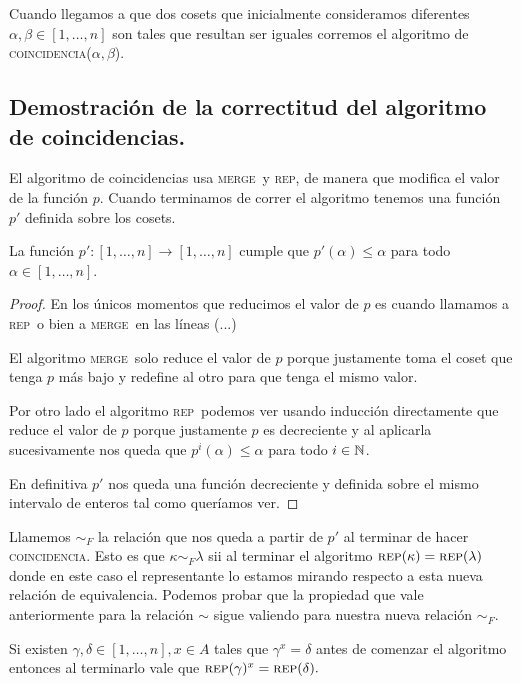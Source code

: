 \documentclass[tesis.tex]{subfiles}
\newcommand{\rep}{\textsc{rep}}
\newcommand{\coin}{\textsc{coincidencia}}
\newcommand{\mer}{\textsc{merge}}
\begin{document}
Cuando llegamos a que dos cosets que inicialmente consideramos diferentes $\alpha, \beta \in [1, \dots, n]$ son tales que resultan ser iguales corremos el algoritmo de \coin($\alpha, \beta$).





\subsection{Demostración de la correctitud del algoritmo de coincidencias.}

El algoritmo de coincidencias usa \mer \ y \rep, de manera que modifica el valor de la función $p$.
Cuando terminamos de correr el algoritmo tenemos una función $p'$ definida sobre los cosets.

\begin{lema}
	La función $p':[1,\dots,n] \to [1,\dots,n]$ cumple que $p'(\alpha) \le \alpha$ para todo $\alpha \in [1,\dots,n]$. 
\end{lema}
\begin{proof}
	En los únicos momentos que reducimos el valor de $p$ es cuando llamamos a \rep \  o bien a \mer \ en las líneas (...)
	
	El algoritmo \mer \  solo reduce el valor de $p$ porque justamente toma el coset que tenga $p$ más bajo y redefine al otro para que tenga el mismo valor.
	
	Por otro lado el algoritmo \rep \ podemos ver usando inducción directamente que reduce el valor de $p$ porque justamente $p$ es decreciente y al aplicarla sucesivamente nos queda que $p^i(\alpha) \le \alpha$ para todo $i \in \mathbb{N}$.
	
	En definitiva $p'$ nos queda una función decreciente y definida sobre el mismo intervalo de enteros tal como queríamos ver.	
\end{proof}


Llamemos $\sim_F$ la relación que nos queda a partir de $p'$ al terminar de hacer \coin.
Esto es que $\kappa \sim_F \lambda$ sii al terminar el algoritmo $\rep (\kappa) = \rep(\lambda)$ donde en este caso el representante lo estamos mirando respecto a esta nueva relación de equivalencia.
Podemos probar que la propiedad que vale anteriormente para la relación $\sim$ sigue valiendo para nuestra nueva relación $\sim_F$.

\begin{lema}\label{lema-rep-coin}
	Si existen $\gamma, \delta \in [1,\dots,n], x \in A$ tales que $\gamma^x = \delta$ antes de comenzar el algoritmo entonces al terminarlo vale que $\rep(\gamma)^x = \rep(\delta).$
\end{lema}
\end{document}
